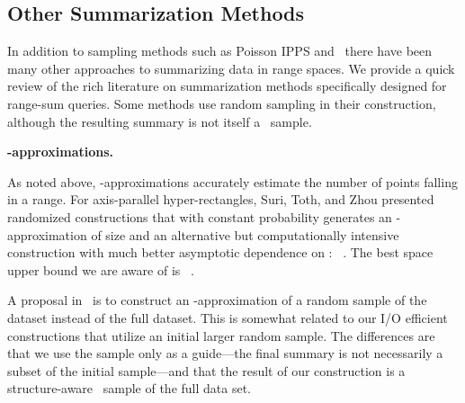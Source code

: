 \documentclass[11pt]{article}
\begin{document}
\subsection*{Other Summarization Methods}
\noindent
In addition to sampling methods such as Poisson IPPS and \varopt\, 
there have been many other approaches to summarizing data in range
spaces. 
We provide a quick review of the rich literature on 
summarization methods specifically designed for range-sum queries.
Some methods use random sampling in their construction,
although the resulting summary is not itself a \varopt\ sample. 


\smallskip
\noindent
{\bf -approximations.}
As noted above, -approximations accurately estimate the
number of points falling in a range. 
For axis-parallel hyper-rectangles, Suri, Toth, and Zhou presented randomized 
constructions that with constant probability 
generates an -approximation 
of size  and an alternative but computationally intensive construction 
with much better asymptotic dependence on : ~\cite{SuriTZ:CG2004}.   
The best space upper bound we are aware of is
~\cite{Phillips:icalp2008}. 

A proposal in~\cite{BCDHS:KDD2003}
is to construct an -approximation of a random sample of the dataset
instead of the full dataset.  This is somewhat related to our I/O efficient
 constructions that utilize an initial larger random sample. 
The differences are that we use the sample only as a guide---the final
summary is not necessarily a subset of the initial sample---and that
the result of our construction is a structure-aware \varopt\ sample of
the full data set. 
\end{document}
